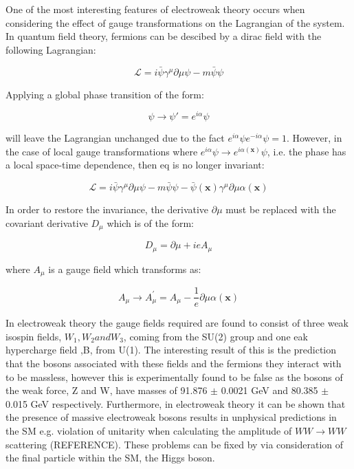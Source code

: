 One of the most interesting features of electroweak theory occurs when considering the effect of gauge transformations on the Lagrangian of the system. In quantum field theory, fermions can be descibed by a dirac field with the following Lagrangian:

\begin{equation}
  \label{eq:diracLagrangian}
\mathscr{L}=i\bar{\psi} \gamma^{\mu} \partial{\mu} \psi  -m\bar{\psi}\psi
\end{equation}

Applying a global phase transition of the form:

\begin{equation}
\psi \rightarrow \psi ' = e^{i\alpha}\psi
\end{equation}

will leave the Lagrangian unchanged due to the fact $e^{i\alpha}\psi e^{-i\alpha}\psi=1$. However, in the case of local gauge transformations where $e^{i\alpha}\psi \rightarrow  e^{i\alpha(\textbf{x})}\psi$, i.e. the phase has a local space-time dependence, then eq is no longer invariant:

\begin{equation}
\mathscr{L}=i\bar{\psi} \gamma^{\mu} \partial{\mu} \psi  -m\bar{\psi}\psi -\bar{\psi}(\textbf{x})\gamma^{\mu}\partial{\mu}\alpha(\textbf{x})
\end{equation}

In order to restore the invariance, the derivative $\partial{\mu}$ must be replaced with the covariant derivative $D_{\mu}$ which is of the form:

\begin{equation}
  D_{\mu}=\partial{\mu}+ieA_{\mu}
\end{equation}

where $A_{\mu}$ is a gauge field which transforms as:

\begin{equation}
  A_{\mu}\rightarrow A_{\mu}^{'} = A_{\mu} - \frac{1}{e}\partial{\mu}\alpha(\textbf{x})
\end{equation}

In electroweak theory the gauge fields required are found to consist of three weak isospin fields, $W_1, W_2 and W_3$,  coming from the SU(2) group and one eak hypercharge field ,B, from U(1). The interesting result of this is the prediction that the bosons associated with these fields and the fermions they interact with to be massless, however this is experimentally found to be false as the bosons of the weak force, Z and W, have masses of 91.876 $\pm$ 0.0021 GeV and 80.385 $\pm$ 0.015 GeV respectively. Furthermore, in electroweak theory it can be shown that the presence of massive electroweak bosons results in unphysical predictions in the \ac{SM} e.g. violation of unitarity when calculating the amplitude of $WW\rightarrow WW$ scattering (REFERENCE). These problems can be fixed by via consideration of the final particle within the \ac{SM}, the Higgs boson.


